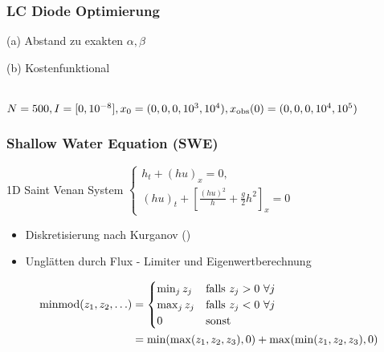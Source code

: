 \begin{frame}[<+->]
\frametitle{LC Diode Optimierung}
\begin{minipage}{0.45\linewidth}
\centering
 
(a) Abstand zu exakten $\alpha,\beta$
\end{minipage}
\begin{minipage}{0.45\linewidth}
\centering
 
(b) Kostenfunktional
\end{minipage}
 \centering
 \\[0.3cm]
  $N=500,I=[0,10^{-8}],x_0=(0,0,0,10^3,10^{4}),x_\text{obs}(0)=(0,0,0,10^4,10^5)$
\end{frame}


\begin{frame}[<+->]
\frametitle{Shallow Water Equation (SWE)}
\begin{minipage}{0.45\linewidth}

\end{minipage}
\begin{minipage}{0.54\linewidth}
 \begin{block}{1D Saint Venan System}
     \centering
     $\begin{cases}
 h_t + (hu)_x = 0,\\
 (hu)_t + \left[\frac{(hu)^2}{h} + \frac{g}{2}h^2\right]_x = 0
\end{cases} $
    \end{block}
   \begin{itemize}
    \item Diskretisierung nach Kurganov (\cite{kurganov2007second})
    \item Unglätten durch Flux - Limiter und Eigenwertberechnung
   \end{itemize}                           
\end{minipage}
\pause
\begin{align*}
\operatorname{minmod}(z_1,z_2,\ldots) &= \begin{cases}
                                  \min_j z_j & \text{falls }z_j>0~\forall j\\
                                  \max_j z_j & \text{falls }z_j<0~\forall j\\
                                  0 & \text{sonst}
                                 \end{cases}\\
&= \min(\max(z_1,z_2,z_3),0) + \max(\min(z_1,z_2,z_3),0)                                 
\end{align*}
\end{frame}
% 
% 
% 
% 


